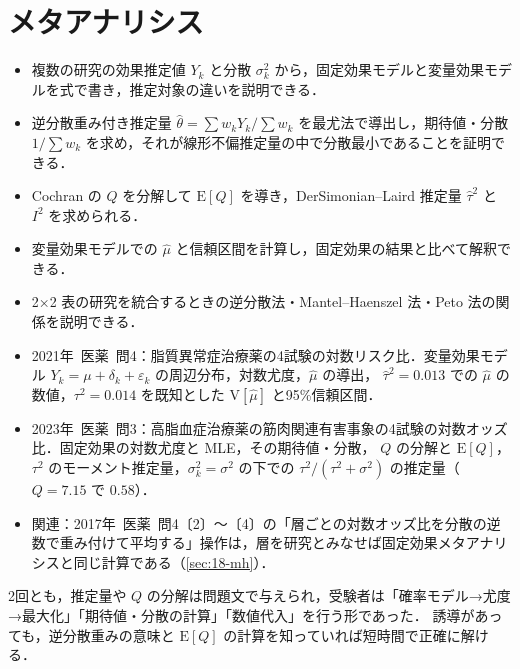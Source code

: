 \documentclass[a4paper,11pt,openany]{ltjsbook}
\newcommand{\kakomon}[2]{\mbox{#1年 医薬 問#2}}
\newcommand{\E}{\mathrm{E}}
\newcommand{\V}{\mathrm{V}}
\begin{document}
\chapter{メタアナリシス}\label{ch:18}

\begin{goalbox}
\begin{itemize}
\item 複数の研究の効果推定値 $Y_k$ と分散 $\sigma_k^2$ から，固定効果モデルと変量効果モデルを式で書き，推定対象の違いを説明できる．
\item 逆分散重み付き推定量 $\hat\theta=\sum w_kY_k/\sum w_k$ を最尤法で導出し，期待値・分散 $1/\sum w_k$ を求め，それが線形不偏推定量の中で分散最小であることを証明できる．
\item Cochran の $Q$ を分解して $\E[Q]$ を導き，DerSimonian--Laird 推定量 $\hat\tau^2$ と $I^2$ を求められる．
\item 変量効果モデルでの $\hat\mu$ と信頼区間を計算し，固定効果の結果と比べて解釈できる．
\item 2×2 表の研究を統合するときの逆分散法・Mantel--Haenszel 法・Peto 法の関係を説明できる．
\end{itemize}
\end{goalbox}

\begin{exambox}
\begin{itemize}
\item \kakomon{2021}{4}：脂質異常症治療薬の4試験の対数リスク比．変量効果モデル $Y_k=\mu+\delta_k+\varepsilon_k$ の周辺分布，対数尤度，$\hat\mu$ の導出，
      $\hat\tau^2=0.013$ での $\hat\mu$ の数値，$\tau^2=0.014$ を既知とした $\V[\hat\mu]$ と95\%信頼区間．
\item \kakomon{2023}{3}：高脂血症治療薬の筋肉関連有害事象の4試験の対数オッズ比．固定効果の対数尤度と MLE，その期待値・分散，
      $Q$ の分解と $\E[Q]$，$\tau^2$ のモーメント推定量，$\sigma_k^2=\sigma^2$ の下での $\tau^2/(\tau^2+\sigma^2)$ の推定量（$Q=7.15$ で $0.58$）．
\item 関連：\kakomon{2017}{4}〔2〕〜〔4〕の「層ごとの対数オッズ比を分散の逆数で重み付けて平均する」操作は，層を研究とみなせば固定効果メタアナリシスと同じ計算である（\cref{sec:18-mh}）．
\end{itemize}
2回とも，推定量や $Q$ の分解は問題文で与えられ，受験者は「確率モデル→尤度→最大化」「期待値・分散の計算」「数値代入」を行う形であった．
誘導があっても，逆分散重みの意味と $\E[Q]$ の計算を知っていれば短時間で正確に解ける．
\end{exambox}
\end{document}
